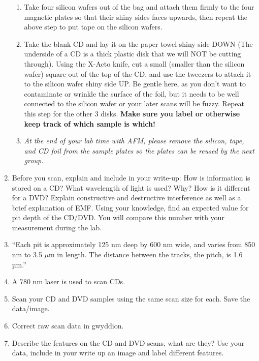 \documentclass{../lab}
\begin{document}
\begin{enumerate}
\begin{enumerate}
    \item Take four silicon wafers out of the bag and attach them firmly to the four magnetic plates so that their shiny sides faces upwards, then repeat the above step to put tape on the silicon wafers.
    
    \item Take the blank CD and lay it on the paper towel shiny side DOWN (The underside of a CD is a thick plastic disk that we will NOT be cutting through). Using the X-Acto knife, cut a small (smaller than the silicon wafer) square out of the top of the CD, and use the tweezers to attach it to the silicon wafer shiny side UP. Be gentle here, as you don't want to contaminate or wrinkle the surface of the foil, but it needs to be well connected to the silicon wafer or your later scans will be fuzzy. Repeat this step for the other 3 disks. \textbf{Make sure you label or otherwise keep track of which sample is which!}
    
    \item \emph{At the end of your lab time with AFM, please remove the silicon, tape, and CD foil from the sample plates so the plates can be reused by the next group.}
    
    \end{enumerate}

    \item Before you scan, explain and include in your write-up: How is information is stored on a CD? What wavelength of light is used? Why? How is it different for a DVD? Explain constructive and destructive interference as well as a brief explanation of EMF. Using your knowledge, find an expected value for pit depth of the CD/DVD. You will compare this number with your measurement during the lab.

    \item ``Each pit is approximately 125 nm deep by 600 nm wide, and varies from 850 nm to 3.5 $\mu$m in length. The distance between the tracks, the pitch, is 1.6 µm.''

    \item A 780 nm laser is used to scan CDs.

    \item Scan your CD and DVD samples using the same scan size for each. Save the data/image.

    \item Correct raw scan data in gwyddion.

    \item Describe the features on the CD and DVD scans, what are they? Use your data, include in your write up an image and label different features.


\end{enumerate}
\end{document}

